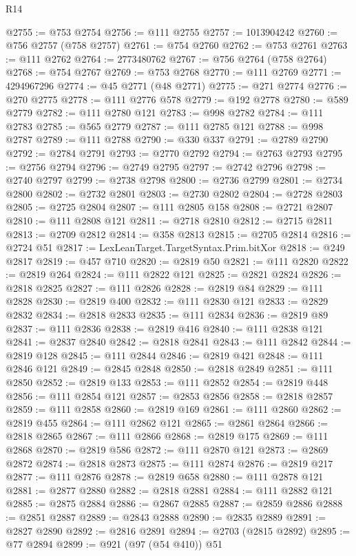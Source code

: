 \begin{lexlean}{R14}
\begin{coremodule}
@2755 := @753 @2754
@2756 := @111 @2755
@2757 := 1013904242
@2760 := @756 @2757 (@758 @2757)
@2761 := @754 @2760
@2762 := @753 @2761
@2763 := @111 @2762
@2764 := 2773480762
@2767 := @756 @2764 (@758 @2764)
@2768 := @754 @2767
@2769 := @753 @2768
@2770 := @111 @2769
@2771 := 4294967296
@2774 := @45 @2771 (@48 @2771)
@2775 := @271 @2774
@2776 := @270 @2775
@2778 := @111 @2776 @578
@2779 := @192 @2778
@2780 := @589 @2779
@2782 := @111 @2780 @121
@2783 := @998 @2782
@2784 := @111 @2783
@2785 := @565 @2779
@2787 := @111 @2785 @121
@2788 := @998 @2787
@2789 := @111 @2788
@2790 := @330 @337
@2791 := @2789 @2790
@2792 := @2784 @2791
@2793 := @2770 @2792
@2794 := @2763 @2793
@2795 := @2756 @2794
@2796 := @2749 @2795
@2797 := @2742 @2796
@2798 := @2740 @2797
@2799 := @2738 @2798
@2800 := @2736 @2799
@2801 := @2734 @2800
@2802 := @2732 @2801
@2803 := @2730 @2802
@2804 := @2728 @2803
@2805 := @2725 @2804
@2807 := @111 @2805 @158
@2808 := @2721 @2807
@2810 := @111 @2808 @121
@2811 := @2718 @2810
@2812 := @2715 @2811
@2813 := @2709 @2812
@2814 := @358 @2813
@2815 := @2705 @2814
@2816 := @2724 @51
@2817 := LexLeanTarget.TargetSyntax.Prim.bitXor
@2818 := @249 @2817
@2819 := @457 @710
@2820 := @2819 @50
@2821 := @111 @2820
@2822 := @2819 @264
@2824 := @111 @2822 @121
@2825 := @2821 @2824
@2826 := @2818 @2825
@2827 := @111 @2826
@2828 := @2819 @84
@2829 := @111 @2828
@2830 := @2819 @400
@2832 := @111 @2830 @121
@2833 := @2829 @2832
@2834 := @2818 @2833
@2835 := @111 @2834
@2836 := @2819 @89
@2837 := @111 @2836
@2838 := @2819 @416
@2840 := @111 @2838 @121
@2841 := @2837 @2840
@2842 := @2818 @2841
@2843 := @111 @2842
@2844 := @2819 @128
@2845 := @111 @2844
@2846 := @2819 @421
@2848 := @111 @2846 @121
@2849 := @2845 @2848
@2850 := @2818 @2849
@2851 := @111 @2850
@2852 := @2819 @133
@2853 := @111 @2852
@2854 := @2819 @448
@2856 := @111 @2854 @121
@2857 := @2853 @2856
@2858 := @2818 @2857
@2859 := @111 @2858
@2860 := @2819 @169
@2861 := @111 @2860
@2862 := @2819 @455
@2864 := @111 @2862 @121
@2865 := @2861 @2864
@2866 := @2818 @2865
@2867 := @111 @2866
@2868 := @2819 @175
@2869 := @111 @2868
@2870 := @2819 @586
@2872 := @111 @2870 @121
@2873 := @2869 @2872
@2874 := @2818 @2873
@2875 := @111 @2874
@2876 := @2819 @217
@2877 := @111 @2876
@2878 := @2819 @658
@2880 := @111 @2878 @121
@2881 := @2877 @2880
@2882 := @2818 @2881
@2884 := @111 @2882 @121
@2885 := @2875 @2884
@2886 := @2867 @2885
@2887 := @2859 @2886
@2888 := @2851 @2887
@2889 := @2843 @2888
@2890 := @2835 @2889
@2891 := @2827 @2890
@2892 := @2816 @2891
@2894 := @2703 (@2815 @2892)
@2895 := @77 @2894
@2899 := @921 (@97 (@54 @410)) @51

\end{coremodule}
\end{lexlean}
